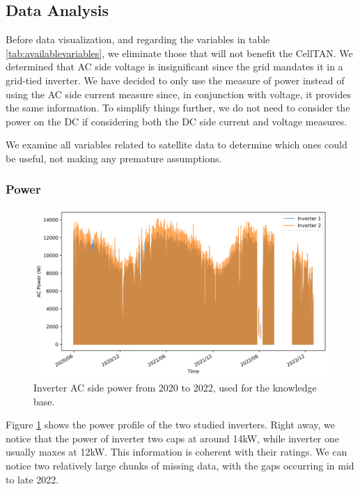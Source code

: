 \subsection{Data Analysis}  \label{subsec:eda}

Before data visualization, and regarding the variables in table \ref{tab:availablevariables}, we eliminate those that will not benefit the CellTAN. We determined that AC side voltage is insignificant since the grid mandates it in a grid-tied inverter. We have decided to only use the measure of power instead of using the AC side current measure since, in conjunction with voltage, it provides the same information. To simplify things further, we do not need to consider the power on the DC if considering both the DC side current and voltage measures.

We examine all variables related to satellite data to determine which ones could be useful, not making any premature assumptions.

\subsubsection{Power}


\begin{figure}[h!]
    \centering
    \includegraphics[width=\textwidth]{figures/chapter5/analysis/00_power_kb-1.png}
    \caption{Inverter AC side power from 2020 to 2022, used for the knowledge base.}
    \label{fig:eda_power_kb}
\end{figure}

Figure \ref{fig:eda_power_kb} shows the power profile of the two studied inverters. Right away, we notice that the power of inverter two caps at around 14kW, while inverter one usually maxes at 12kW. This information is coherent with their ratings. We can notice two relatively large chunks of missing data, with the gaps occurring in mid to late 2022.


